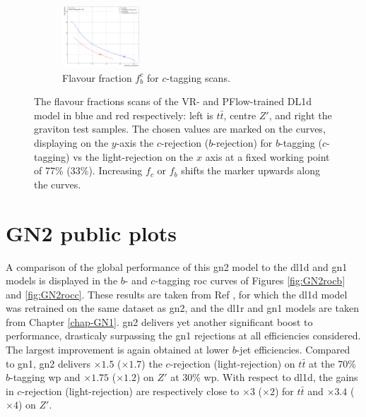 \begin{figure}[h!]
\begin{subfigure}[b]{\textwidth}
    \includegraphics[width=0.32\textwidth]{Images/FTAG/VRDL1d/scansfraction/thesis_plot_frac_c/contour_fraction_graviton_2000.pdf}
    \caption{Flavour fraction $f_b^c$ for $c$-tagging scans.} 
    \label{fig:DL1dVRscanfc}
\end{subfigure}
  \caption{The flavour fractions scans of the VR- and PFlow-trained DL1d model in blue and red respectively: left is $t\bar{t}$, centre $Z'$, and right the graviton test samples. The chosen values are marked on the curves, displaying on the $y$-axis the $c$-rejection ($b$-rejection) for $b$-tagging ($c$-tagging) vs the light-rejection on the $x$ axis at a fixed working point of 77\% (33\%). Increasing $f_c$ or $f_b$ shifts the marker upwards along the curves. }
  \label{apfig:DL1dVRscanf}
\end{figure} 

\section{GN2 public plots}
A comparison of the global performance of this \gls{gn2} model to the \gls{dl1d} and \gls{gn1} models is displayed in the $b$- and $c$-tagging \gls{roc} curves of Figures \ref{fig:GN2rocb} and \ref{fig:GN2rocc}. These results are taken from Ref \cite{ATL-PLOT-FTAG-2023-01}, for which the \gls{dl1d} model was retrained on the same dataset as \gls{gn2}, and the \gls{dl1r} and \gls{gn1} models are taken from Chapter \ref{chap-GN1}. \gls{gn2} delivers yet another significant boost to performance, drasticaly surpassing the \gls{gn1} rejections at all efficiencies considered. The largest improvement is again obtained at lower $b$-jet efficiencies. Compared to \gls{gn1}, \gls{gn2} delivers $\times 1.5$ ($\times 1.7$) the $c$-rejection (light-rejection) on $t\bar{t}$ at the 70\% $b$-tagging \gls{wp} and $\times 1.75$ ($\times 1.2$) on $Z'$ at 30\% \gls{wp}. With respect to \gls{dl1d}, the gains in $c$-rejection (light-rejection) are respectively close to $\times 3$ ($\times 2$) for $t\bar{t}$ and $\times 3.4$ ($\times 4$) on $Z'$. 

